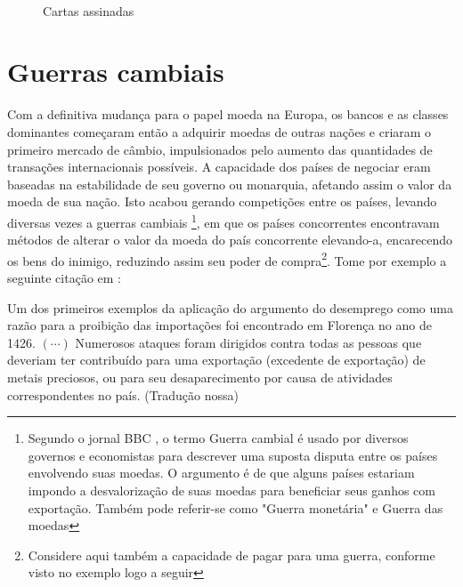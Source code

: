 \begin{figure}[H]\label{card}
		\caption{Cartas assinadas}%
		\quad
		\begin{center}
			\\
		\end{center}
\end{figure}

\section{Guerras cambiais}
Com a definitiva mudança para o papel moeda na Europa, os bancos e as classes dominantes começaram então a adquirir moedas de outras nações e criaram o primeiro mercado de câmbio, impulsionados pelo aumento das quantidades de transações internacionais possíveis. A capacidade dos países de negociar eram baseadas na estabilidade de seu governo ou monarquia, afetando assim o valor da moeda de sua nação. Isto acabou gerando competições entre os países, levando diversas vezes a guerras cambiais \footnote{Segundo o jornal BBC \cite{BBC1}, o termo Guerra cambial é usado por diversos governos e economistas para descrever uma suposta disputa entre os países envolvendo suas moedas. O argumento é de que alguns países estariam impondo a desvalorização de suas moedas para beneficiar seus ganhos com exportação. Também pode referir-se como "Guerra monetária" e Guerra das moedas}, em que os países concorrentes encontravam métodos de alterar o valor da moeda do país concorrente elevando-a, encarecendo os bens do inimigo, reduzindo assim seu poder de compra\footnote{Considere aqui também a capacidade de pagar para uma guerra, conforme visto no exemplo logo a seguir}. Tome por exemplo a seguinte citação em \cite{KEYNES}:

\begin{citacao}
	Um dos primeiros exemplos da aplicação do argumento do desemprego como uma razão para a proibição das importações foi encontrado em Florença no ano de 1426. $(\cdots)$ Numerosos ataques foram dirigidos contra todas as pessoas que deveriam ter contribuído para uma exportação (excedente de exportação) de metais preciosos, ou para seu desaparecimento por causa de atividades correspondentes no país. (Tradução nossa)
\end{citacao}

